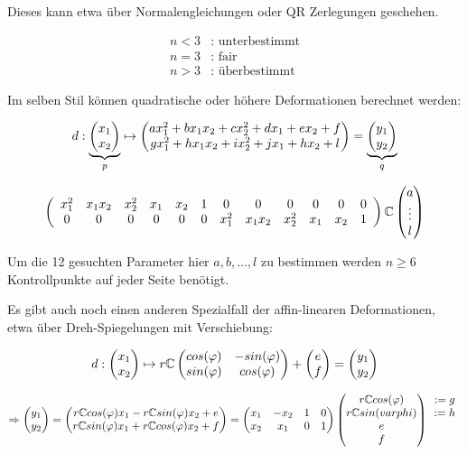 Dieses kann etwa über Normalengleichungen oder QR Zerlegungen geschehen.

\begin{align*}
    n<3&\text{: unterbestimmt}\\
    n=3&\text{: fair}\\
    n>3&\text{: überbestimmt}
\end{align*}

Im selben Stil können quadratische oder höhere Deformationen berechnet werden:

\[d:\underbrace{\begin{pmatrix} x_1 \\ x_2 \end{pmatrix}}_{p} \mapsto \begin{pmatrix} ax_1^2 + b x_1 x_2 + c x_2^2 + d x_1 + e x_2 +f\\ g x_1^2 + hx_1x_2 + ix_2^2 + jx_1 + hx_2 +l \end{pmatrix} = \underbrace{\begin{pmatrix} y_1\\y_2 \end{pmatrix}}_{q}\]

\[\left(
    \begin{array}{*{12}c}
        x_1^2 & x_1x_2 & x_2^2 & x_1 & x_2 & 1 & 0 & 0 & 0 & 0 & 0 & 0\\
        0 & 0 & 0 & 0 & 0 & 0 & x_1^2 & x_1x_2 & x_2^2 & x_1 & x_2 & 1
    \end{array}
    \right) \C \mat{a\\ \vdots \\ l}\]

Um die 12 gesuchten Parameter hier $a,b, ... ,l$ zu bestimmen werden $n \geq 6$ Kontrollpunkte auf jeder Seite benötigt.

Es gibt auch noch einen anderen Spezialfall der affin-linearen Deformationen, etwa über Dreh-Spiegelungen mit Verschiebung:

\[d: \begin{pmatrix} x_1\\x_2 \end{pmatrix} \mapsto r \mathbb{C} \begin{pmatrix} cos(\varphi) & -sin(\varphi)\\ sin(\varphi) & cos(\varphi) \end{pmatrix} + \begin{pmatrix} e\\f \end{pmatrix}=\begin{pmatrix} y_1\\y_2 \end{pmatrix}\]

\[\Rightarrow \begin{pmatrix} y_1\\y_2 \end{pmatrix} = \begin{pmatrix} r \mathbb{C} cos(\varphi)x_1 -r \mathbb{C} sin(\varphi)x_2 + e\\ r \mathbb{C} sin(\varphi)x_1 + r \mathbb{C} cos(\varphi) x_2 + f \end{pmatrix} = \begin{pmatrix} x_1 & -x_2 & 1 & 0\\ x_2 & x_1 & 0 & 1 \end{pmatrix} \begin{pmatrix} r \mathbb{C} cos(\varphi)\\ r \mathbb{C} sin(varphi)\\e \\ f \end{pmatrix} \begin{array}{c}
    :=g\\:=h\\ \ \\ \
\end{array}\]

